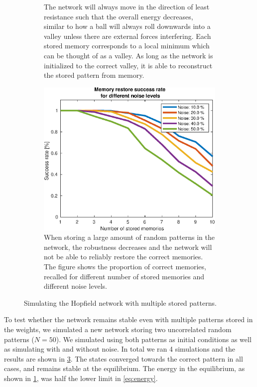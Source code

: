 \begin{figure}[H]
\begin{subfigure}{0.49\textwidth}
        \caption{The network will always move in the direction of least resistance such that the overall energy decreases, similar to how a ball will always roll downwards into a valley unless there are external forces interfering. Each stored memory corresponds to a local minimum which can be thought of as a valley. As long as the network is initialized to the correct valley, it is able to reconstruct the stored pattern from memory.}
        \label{fig:multiple-energy}
    \end{subfigure}
    \begin{subfigure}{0.49\textwidth}
        \includegraphics[width=\textwidth]{figs/capacity.eps}
        \caption{When storing a large amount of random patterns in the network, the robustness decreases and the network will not be able to reliably restore the correct memories. The figure shows the proportion of correct memories, recalled for different number of stored memories and different noise levels.}
        \label{fig:multiple-capacity}
    \end{subfigure}
    \caption{Simulating the Hopfield network with multiple stored patterns.}
    \label{fig:multiple}
\end{figure}
To test whether the network remains stable even with multiple patterns stored in the weights, we simulated a new network storing two uncorrelated random patterns ($N=50$). We simulated using both patterns as initial conditions as well as simulating with and without noise. In total we ran 4 simulations and the results are shown in \cref{fig:multiple}. The states converged towards the correct pattern in all cases, and remains stable at the equilibrium. The energy in the equilibrium, as shown in \cref{fig:multiple-energy}, was half the lower limit in \cref{eq:energy}.

